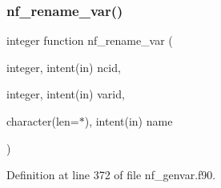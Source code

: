 \subsubsection{\texorpdfstring{nf\+\_\+rename\+\_\+var()}{nf\_rename\_var()}}
{\footnotesize\ttfamily integer function nf\+\_\+rename\+\_\+var (\begin{DoxyParamCaption}\item[{integer, intent(in)}]{ncid,  }\item[{integer, intent(in)}]{varid,  }\item[{character(len=$\ast$), intent(in)}]{name }\end{DoxyParamCaption})}



Definition at line 372 of file nf\+\_\+genvar.\+f90.

